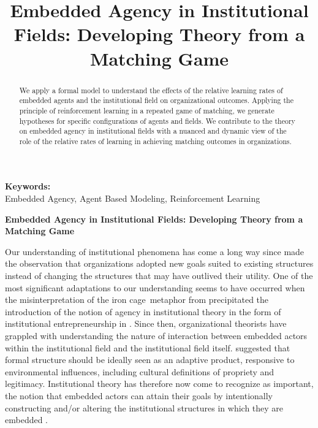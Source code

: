 \documentclass[12pt,letterpaper]{article}
\begin{document}
\title{Embedded Agency in Institutional Fields: Developing Theory from a Matching Game}

\maketitle

\begin{abstract}
\normalsize
We apply a formal model to understand the effects of the relative learning rates of embedded agents and the institutional field on organizational outcomes. Applying the principle of reinforcement learning in a repeated game of matching, we generate hypotheses for specific configurations of agents and fields. We contribute to the theory on embedded agency in institutional fields with a nuanced and dynamic view of the role of the relative rates of learning in achieving matching outcomes in organizations.
\end{abstract}


{\textbf{Keywords:} \\\indent Embedded Agency, Agent Based Modeling, Reinforcement Learning}

\newpage
\pagestyle{fancy}
\fancyhf{}
\cfoot{\thepage}
\begin{center}
\textbf{Embedded Agency in Institutional Fields: Developing Theory from a Matching Game}
\end{center}
Our understanding of  institutional phenomena has come a long way since \cite{Selznick1957} made the observation that organizations adopted new goals suited to existing structures  instead of changing the structures that may have outlived their utility. One of the most significant adaptations to our understanding seems to have occurred when the misinterpretation of the \textquotesingle iron cage\textquotesingle \ metaphor from  \cite{Dimaggio1983} precipitated the introduction of the notion of agency in institutional theory in the form of institutional entrepreneurship in \cite{Dimaggio1988}. Since then, organizational theorists have grappled with understanding the nature of interaction between embedded actors within the institutional field and the institutional field itself.  \cite{Selznick1996} suggested that formal structure should be ideally seen as an adaptive product, responsive to environmental influences, including cultural definitions of propriety and legitimacy. Institutional theory has therefore now come to recognize as important, the notion that embedded actors can attain their goals by intentionally constructing and/or altering the institutional structures in which they are embedded \citep{Philips2009}. 
\end{document}
